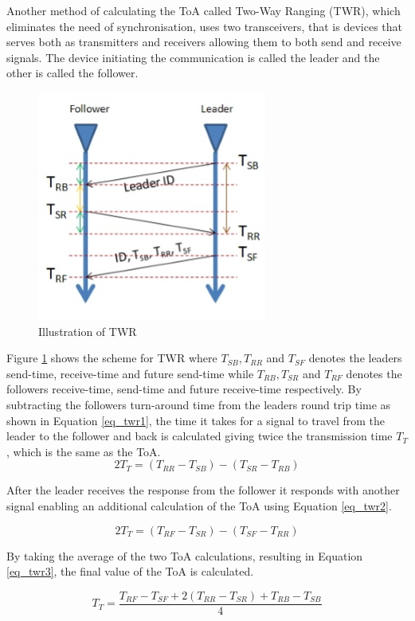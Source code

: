 		Another method of calculating the ToA called Two-Way Ranging (TWR), which eliminates the need of synchronisation, uses two transceivers, that is devices that serves both as transmitters and receivers allowing them to both send and receive signals. The device initiating the communication is called the leader and the other is called the follower.
		\begin{figure}[H] 
		  \centering
		      \includegraphics[height=0.5\textwidth]{img/TWR}
		  \caption{Illustration of TWR}
		  \label{fig_twr}
		\end{figure}
		Figure \ref{fig_twr} shows the scheme for TWR where $T_{SB},T_{RR}$ and $T_{SF}$ denotes the leaders send-time, receive-time and future send-time while $T_{RB},T_{SR}$ and $T_{RF}$ denotes the followers receive-time, send-time and future receive-time respectively. By subtracting the followers turn-around time from the leaders round trip time as shown in Equation \ref{eq_twr1}, the time it takes for a signal to travel from the leader to the follower and back is calculated giving twice the transmission time $T_T$, which is the same as the ToA. 
		\begin{equation} \label{eq_twr1}
		2T_{T} = (T_{RR} - T_{SB}) - (T_{SR} - T_{RB})
		\end{equation}

		After the leader receives the response from the follower it responds with another signal enabling an additional calculation of the ToA using Equation \ref{eq_twr2}.

		\begin{equation} \label{eq_twr2}
		2T_{T} = (T_{RF} - T_{SR}) - (T_{SF} - T_{RR})
		\end{equation}

		By taking the average of the two ToA calculations, resulting in Equation \ref{eq_twr3}, the final value of the ToA is calculated.

		\begin{equation} \label{eq_twr3}
		T_{T} = \frac{T_{RF} - T_{SF} + 2(T_{RR} - T_{SR}) + T_{RB} - T_{SB}}{4}
		\end{equation}
\clearpage